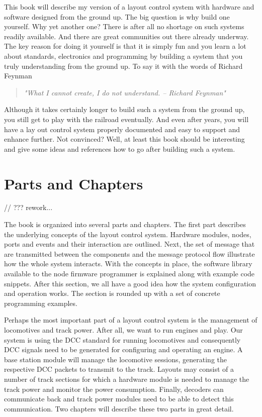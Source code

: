 This book will describe my version of a layout control system with hardware and software designed from the ground up. The big question is why build one yourself. Why yet another one? There is after all no shortage on such systems readily available. And there are great communities out there already underway. The key reason for doing it yourself is that it is simply fun and you learn a lot about standards, electronics and programming by building a system that you truly understanding from the ground up. To say it with the words of Richard Feynman

\begin{quotation}
    \textit{ "What I cannot create, I do not understand. -- Richard Feynman"}
\end{quotation}

Although it takes certainly longer to build such a system from the ground up, you still get to play with the railroad eventually. And even after years, you will have a lay  out control system properly documented and easy to support and enhance further. Not convinced? Well, at least this book should be interesting and give some ideas and references how to go after building such a system.

\section*{Parts and Chapters}

// ??? rework...

The book is organized into several parts and chapters. The first part describes the underlying concepts of the layout control system. Hardware modules, nodes, ports and events and their interaction are outlined. Next, the set of message that are transmitted between the components and the message protocol flow illustrate how the whole system interacts. With the concepts in place, the software library available to the node firmware programmer is explained along with example code snippets. After this section, we all have a good idea how the system configuration and operation works. The section is rounded up with a set of concrete programming examples.

Perhaps the most important part of a layout control system is the management of locomotives and track power. After all, we want to run engines and play. Our system is using the DCC standard for running locomotives and consequently DCC signals need to be generated for configuring and operating an engine. A base station module will manage the locomotive sessions, generating the respective DCC packets to transmit to the track. Layouts may consist of a number of track sections for which a hardware module is needed to manage the track power and monitor the power consumption. Finally, decoders can communicate back and track power modules need to be able to detect this communication. Two chapters will describe these two parts in great detail.

